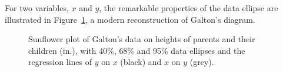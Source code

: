 \documentclass[
  letterpaper,
  10pt,
  krantz2]{krantz}
\begin{document}
For two variables, \(x\) and \(y\), the remarkable properties of the
data ellipse are illustrated in Figure~\ref{fig-galton-ellipse-r}, a
modern reconstruction of Galton's diagram.

\begin{figure}


\caption{\label{fig-galton-ellipse-r}Sunflower plot of Galton's data on
heights of parents and their children (in.), with 40\%, 68\% and 95\%
data ellipses and the regression lines of \(y\) on \(x\) (black) and
\(x\) on \(y\) (grey).}

\end{figure}%
\end{document}
